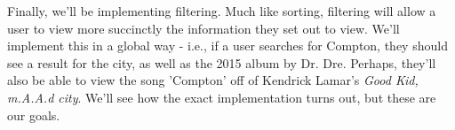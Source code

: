 \documentclass{scrartcl}
\begin{document}
Finally, we'll be implementing filtering. Much like sorting, filtering will allow a user to view more succinctly the information they set out to view. We'll implement this in a global way - i.e., if a user searches for Compton, they should see a result for the city, as well as the 2015 album by Dr. Dre. Perhaps, they'll also be able to view the song 'Compton' off of Kendrick Lamar's \textit{Good Kid, m.A.A.d city}. We'll see how the exact implementation turns out, but these are our goals.
\end{document}
